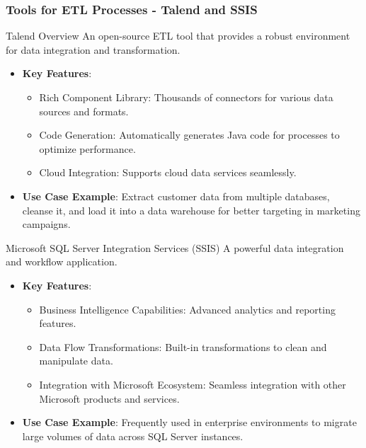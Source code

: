 \documentclass{beamer}
\begin{document}
\begin{frame}[fragile]
    \frametitle{Tools for ETL Processes - Talend and SSIS}
    \begin{block}{Talend Overview}
        An open-source ETL tool that provides a robust environment for data integration and transformation.
    \end{block}
    \begin{itemize}
        \item \textbf{Key Features}:
        \begin{itemize}
            \item Rich Component Library: Thousands of connectors for various data sources and formats.
            \item Code Generation: Automatically generates Java code for processes to optimize performance.
            \item Cloud Integration: Supports cloud data services seamlessly.
        \end{itemize}
        \item \textbf{Use Case Example}: Extract customer data from multiple databases, cleanse it, and load it into a data warehouse for better targeting in marketing campaigns.
    \end{itemize}
    
    \begin{block}{Microsoft SQL Server Integration Services (SSIS)}
        A powerful data integration and workflow application.
    \end{block}
    \begin{itemize}
        \item \textbf{Key Features}:
        \begin{itemize}
            \item Business Intelligence Capabilities: Advanced analytics and reporting features.
            \item Data Flow Transformations: Built-in transformations to clean and manipulate data.
            \item Integration with Microsoft Ecosystem: Seamless integration with other Microsoft products and services.
        \end{itemize}
        \item \textbf{Use Case Example}: Frequently used in enterprise environments to migrate large volumes of data across SQL Server instances.
    \end{itemize}
\end{frame}
\end{document}
